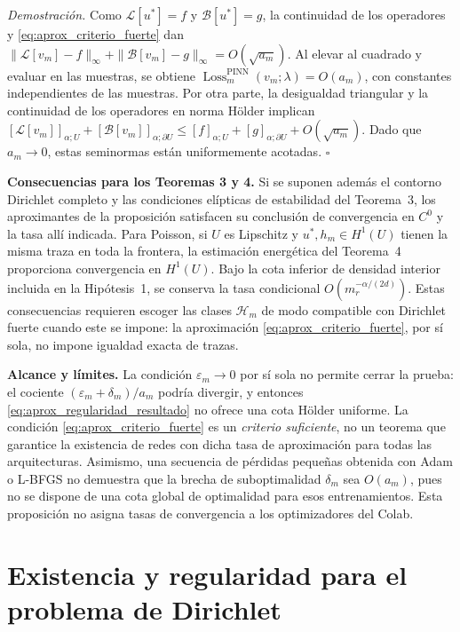 \noindent\textit{Demostración.}
Como $\mathcal L[u^*]=f$ y $\mathcal B[u^*]=g$,
la continuidad de los operadores y
\eqref{eq:aprox_criterio_fuerte} dan
$\|\mathcal L[v_m]-f\|_\infty
+\|\mathcal B[v_m]-g\|_\infty=O(\sqrt{a_m})$.
Al elevar al cuadrado y evaluar en las muestras, se obtiene
$\operatorname{Loss}^{\mathrm{PINN}}_m(v_m;\lambda)=O(a_m)$,
con constantes independientes de las muestras.
Por otra parte, la desigualdad triangular y la continuidad de los
operadores en norma Hölder implican
$[\mathcal L[v_m]]_{\alpha;U}+[\mathcal B[v_m]]_{\alpha;\partial U}
\leq [f]_{\alpha;U}+[g]_{\alpha;\partial U}+O(\sqrt{a_m})$.
Dado que $a_m\to0$, estas seminormas están uniformemente acotadas.
\hfill$\square$

\medskip
\noindent\textbf{Consecuencias para los Teoremas 3 y 4.}
Si se suponen además el contorno Dirichlet completo y las condiciones
elípticas de estabilidad del Teorema~3, los aproximantes de la
proposición satisfacen su conclusión de convergencia en $C^0$ y la
tasa allí indicada. Para Poisson, si $U$ es Lipschitz y
$u^*,h_m\in H^1(U)$ tienen la misma traza en toda la frontera, la
estimación energética del Teorema~4 proporciona convergencia en
$H^1(U)$. Bajo la cota inferior de densidad interior incluida en la
Hipótesis~1, se conserva la tasa condicional
$O(m_r^{-\alpha/(2d)})$.
Estas consecuencias requieren escoger las clases $\mathcal H_m$ de modo
compatible con Dirichlet fuerte cuando este se impone: la aproximación
\eqref{eq:aprox_criterio_fuerte}, por sí sola, no impone igualdad exacta
de trazas.

\medskip
\noindent\textbf{Alcance y límites.}
La condición $\varepsilon_m\to0$ por sí sola no permite cerrar la
prueba: el cociente $(\varepsilon_m+\delta_m)/a_m$ podría divergir,
y entonces \eqref{eq:aprox_regularidad_resultado} no ofrece una cota
Hölder uniforme. La condición \eqref{eq:aprox_criterio_fuerte} es un
\emph{criterio suficiente}, no un teorema que garantice la existencia
de redes con dicha tasa de aproximación para todas las arquitecturas.
Asimismo, una secuencia de pérdidas pequeñas obtenida con Adam o
L-BFGS no demuestra que la brecha de suboptimalidad $\delta_m$ sea
$O(a_m)$, pues no se dispone de una cota global de optimalidad para
esos entrenamientos. Esta proposición no asigna tasas de convergencia a
los optimizadores del Colab.

\section{Existencia y regularidad para el problema de Dirichlet}
\label{sec:existencia_dirichlet}


